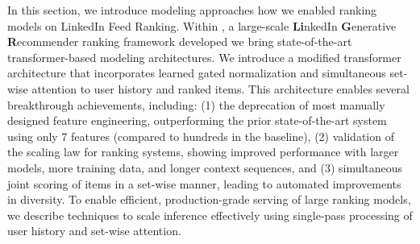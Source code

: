 In this section, we introduce modeling approaches how we enabled ranking models on LinkedIn Feed Ranking. Within {\systemname}, a large-scale \textbf{Li}nkedIn \textbf{G}enerative \textbf{R}ecommender ranking framework developed we bring state-of-the-art transformer-based modeling architectures. We introduce a modified transformer architecture that incorporates learned gated normalization and simultaneous set-wise attention to user history and ranked items. This architecture enables several breakthrough achievements, including:
(1) the deprecation of most manually designed feature engineering, outperforming the prior state-of-the-art system using only
7 features (compared to hundreds in the baseline), (2) validation
of the scaling law for ranking systems, showing improved performance with larger models, more training data, and longer context
sequences, and (3) simultaneous joint scoring of items in a set-wise
manner, leading to automated improvements in diversity. To enable
efficient, production-grade serving of large ranking models, we
describe techniques to scale inference effectively using single-pass
processing of user history and set-wise attention. 




%





